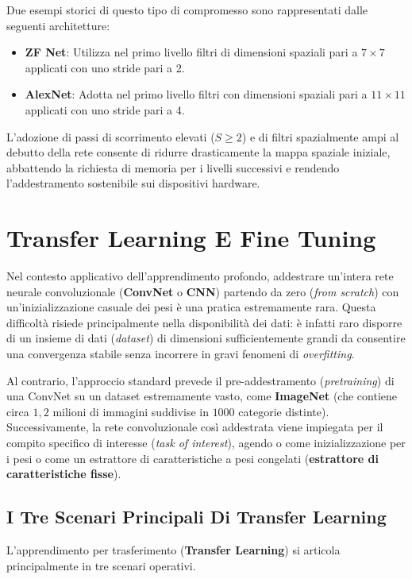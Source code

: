 ﻿\documentclass[11pt, a4paper]{article}
\begin{document}
Due esempi storici di questo tipo di compromesso sono rappresentati dalle seguenti architetture:
\begin{itemize}
    \item \textbf{ZF Net}: Utilizza nel primo livello filtri di dimensioni spaziali pari a $7 \times 7$ applicati con uno stride pari a 2.
    \item \textbf{AlexNet}: Adotta nel primo livello filtri con dimensioni spaziali pari a $11 \times 11$ applicati con uno stride pari a 4.
\end{itemize}
L'adozione di passi di scorrimento elevati ($S \ge 2$) e di filtri spazialmente ampi al debutto della rete consente di ridurre drasticamente la mappa spaziale iniziale, abbattendo la richiesta di memoria per i livelli successivi e rendendo l'addestramento sostenibile sui dispositivi hardware.

\section{Transfer Learning E Fine Tuning}
Nel contesto applicativo dell'apprendimento profondo, addestrare un'intera rete neurale convoluzionale (\textbf{ConvNet} o \textbf{CNN}) partendo da zero (\emph{from scratch}) con un'inizializzazione casuale dei pesi è una pratica estremamente rara. Questa difficoltà risiede principalmente nella disponibilità dei dati: è infatti raro disporre di un insieme di dati (\emph{dataset}) di dimensioni sufficientemente grandi da consentire una convergenza stabile senza incorrere in gravi fenomeni di \emph{overfitting}.

Al contrario, l'approccio standard prevede il pre-addestramento (\emph{pretraining}) di una ConvNet su un dataset estremamente vasto, come \textbf{ImageNet} (che contiene circa $1{,}2$ milioni di immagini suddivise in $1000$ categorie distinte). Successivamente, la rete convoluzionale così addestrata viene impiegata per il compito specifico di interesse (\emph{task of interest}), agendo o come inizializzazione per i pesi o come un estrattore di caratteristiche a pesi congelati (\textbf{estrattore di caratteristiche fisse}).

\subsection{I Tre Scenari Principali Di Transfer Learning}
L'apprendimento per trasferimento (\textbf{Transfer Learning}) si articola principalmente in tre scenari operativi.
\end{document}
